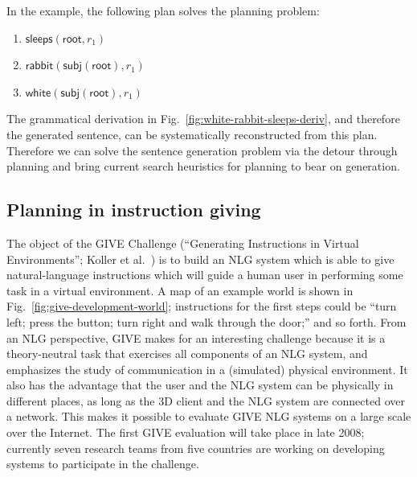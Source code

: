 In the example, the following plan solves the planning problem:
\begin{enumerate}
\item $\mathsf{sleeps}(\mathsf{root}, r_1)$
\item $\mathsf{rabbit}(\mathsf{subj}(\mathsf{root}), r_1)$
\item $\mathsf{white}(\mathsf{subj}(\mathsf{root}), r_1)$
\end{enumerate}

The grammatical derivation in
Fig.~\ref{fig:white-rabbit-sleeps-deriv}, and therefore the generated
sentence, can be systematically reconstructed from this plan.
Therefore we can solve the sentence generation problem via the detour
through planning and bring current search heuristics for planning to
bear on generation.








\subsection{Planning in instruction giving}

The object of the GIVE Challenge (``Generating Instructions in Virtual
Environments''; Koller et al.\
\citeyear{alexander07:_shared_task_propos}) is to build an NLG system
which is able to give natural-language instructions which will guide a
human user in performing some task in a virtual environment.  A map of
an example world is shown in Fig.~\ref{fig:give-development-world};
instructions for the first steps could be ``turn left; press the
button; turn right and walk through the door;'' and so forth.  From an
NLG perspective, GIVE makes for an interesting challenge because it is
a theory-neutral task that exercises all components of an NLG system,
and emphasizes the study of communication in a (simulated) physical
environment.  It also has the advantage that the user and the NLG
system can be physically in different places, as long as the 3D client
and the NLG system are connected over a network.  This makes it
possible to evaluate GIVE NLG systems on a large scale over the
Internet.  The first GIVE evaluation will take place in late 2008;
currently seven research teams from five countries are working on
developing systems to participate in the challenge.

